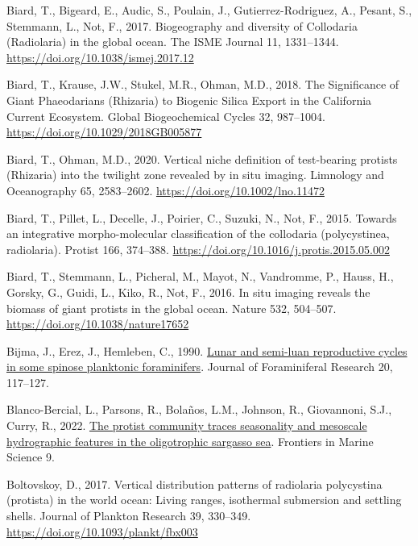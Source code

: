 \documentclass[
]{article}
\newlength{\cslhangindent}
\newlength{\cslentryspacingunit} %
\newenvironment{CSLReferences}[2] %
 {%
  \setlength{\parindent}{0pt}
  \ifodd #1
  \let\oldpar\par
  \def\par{\hangindent=\cslhangindent\oldpar}
  \fi
  \setlength{\parskip}{#2\cslentryspacingunit}
 }%
 {}
\begin{document}
\begin{CSLReferences}{1}{0}
\leavevmode{}%
Biard, T., Bigeard, E., Audic, S., Poulain, J., Gutierrez-Rodriguez, A.,
Pesant, S., Stemmann, L., Not, F., 2017. Biogeography and diversity of
Collodaria (Radiolaria) in the global ocean. The ISME Journal 11,
1331--1344. \url{https://doi.org/10.1038/ismej.2017.12}

\leavevmode{}%
Biard, T., Krause, J.W., Stukel, M.R., Ohman, M.D., 2018. The
Significance of Giant Phaeodarians (Rhizaria) to Biogenic Silica Export
in the California Current Ecosystem. Global Biogeochemical Cycles 32,
987--1004. \url{https://doi.org/10.1029/2018GB005877}

\leavevmode{}%
Biard, T., Ohman, M.D., 2020. Vertical niche definition of test-bearing
protists (Rhizaria) into the twilight zone revealed by in situ imaging.
Limnology and Oceanography 65, 2583--2602.
\url{https://doi.org/10.1002/lno.11472}

\leavevmode{}%
Biard, T., Pillet, L., Decelle, J., Poirier, C., Suzuki, N., Not, F.,
2015. Towards an integrative morpho-molecular classification of the
collodaria (polycystinea, radiolaria). Protist 166, 374--388.
\url{https://doi.org/10.1016/j.protis.2015.05.002}

\leavevmode{}%
Biard, T., Stemmann, L., Picheral, M., Mayot, N., Vandromme, P., Hauss,
H., Gorsky, G., Guidi, L., Kiko, R., Not, F., 2016. In situ imaging
reveals the biomass of giant protists in the global ocean. Nature 532,
504--507. \url{https://doi.org/10.1038/nature17652}

\leavevmode{}%
Bijma, J., Erez, J., Hemleben, C., 1990.
\href{https://epic.awi.de/id/eprint/6096/1/Bij1990a.pdf}{Lunar and
semi-luan reproductive cycles in some spinose planktonic foraminifers}.
Journal of Foraminiferal Research 20, 117--127.

\leavevmode{}%
Blanco-Bercial, L., Parsons, R., Bolaños, L.M., Johnson, R., Giovannoni,
S.J., Curry, R., 2022.
\href{https://www.frontiersin.org/articles/10.3389/fmars.2022.897140}{The
protist community traces seasonality and mesoscale hydrographic features
in the oligotrophic sargasso sea}. Frontiers in Marine Science 9.

\leavevmode{}%
Boltovskoy, D., 2017. Vertical distribution patterns of radiolaria
polycystina (protista) in the world ocean: Living ranges, isothermal
submersion and settling shells. Journal of Plankton Research 39,
330--349. \url{https://doi.org/10.1093/plankt/fbx003}


\end{CSLReferences}
\end{document}
